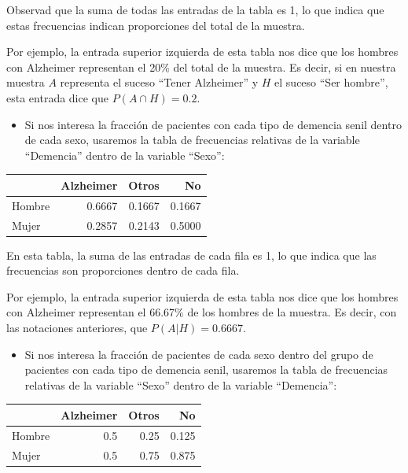 \documentclass[
  spanish,
  letterpaper,
  DIV=11,
  numbers=noendperiod]{scrreprt}
\newcounter{none} %
\providecommand{\tightlist}{%
  \setlength{\itemsep}{0pt}\setlength{\parskip}{0pt}}
\begin{document}
Observad que la suma de todas las entradas de la tabla es 1, lo que
indica que estas frecuencias indican proporciones del total de la
muestra.

Por ejemplo, la entrada superior izquierda de esta tabla nos dice que
los hombres con Alzheimer representan el 20\% del total de la muestra.
Es decir, si en nuestra muestra \(A\) representa el suceso ``Tener
Alzheimer'' y \(H\) el suceso ``Ser hombre'', esta entrada dice que
\(P(A\cap H)=0.2\).

\begin{itemize}
\tightlist
\item
  Si nos interesa la fracción de pacientes con cada tipo de demencia
  senil dentro de cada sexo, usaremos la tabla de frecuencias relativas
  de la variable ``Demencia'' dentro de la variable ``Sexo'':
\end{itemize}

{\def\LTcaptype{none} %
\begin{longtable}[]{@{}lrrr@{}}
\toprule\noalign{}
& Alzheimer & Otros & No \\
\midrule\noalign{}
\endhead
\bottomrule\noalign{}
\endlastfoot
Hombre & 0.6667 & 0.1667 & 0.1667 \\
Mujer & 0.2857 & 0.2143 & 0.5000 \\
\end{longtable}
}

En esta tabla, la suma de las entradas de cada fila es 1, lo que indica
que las frecuencias son proporciones dentro de cada fila.

Por ejemplo, la entrada superior izquierda de esta tabla nos dice que
los hombres con Alzheimer representan el 66.67\% de los hombres de la
muestra. Es decir, con las notaciones anteriores, que \(P(A|H)=0.6667\).

\begin{itemize}
\tightlist
\item
  Si nos interesa la fracción de pacientes de cada sexo dentro del grupo
  de pacientes con cada tipo de demencia senil, usaremos la tabla de
  frecuencias relativas de la variable ``Sexo'' dentro de la variable
  ``Demencia'':
\end{itemize}

{\def\LTcaptype{none} %
\begin{longtable}[]{@{}lrrr@{}}
\toprule\noalign{}
& Alzheimer & Otros & No \\
\midrule\noalign{}
\endhead
\bottomrule\noalign{}
\endlastfoot
Hombre & 0.5 & 0.25 & 0.125 \\
Mujer & 0.5 & 0.75 & 0.875 \\
\end{longtable}
}
\end{document}
